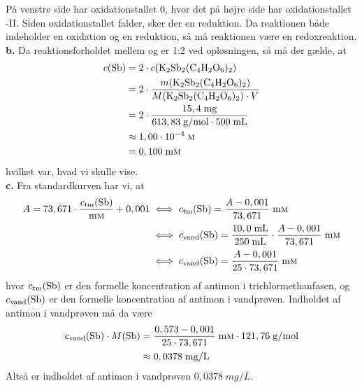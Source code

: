 \documentclass{report}
\begin{document}
På venstre side har  oxidationstallet $0$, hvor det på højre side har oxidationstallet -II. 
Siden oxidationstallet falder, sker der en reduktion.
Da reaktionen både indeholder en oxidation og en reduktion, så må reaktionen være en redoxreaktion.\\[1ex]
\textbf{b.}
Da reaktionsforholdet mellem  og  er 1:2 ved opløsningen, så må der gælde, at
\begin{equation*}
\begin{split}
  c(\ce{Sb} )&=2 \cdot c(\ce{K2Sb2(C4H2O6)2})\\
  &=2 \cdot \frac{m(\ce{K2Sb2(C4H2O6)2})}{M(\ce{K2Sb2(C4H2O6)2}) \cdot V}\\
  &=2 \cdot \frac{15,4\;\unit{mg} }{613,83 \;\unit{g/mol} \cdot 500 \;\unit{mL} }\\
  &\approx 1,00 \cdot 10 ^{-4} \;\unit{\textsc{m}} \\
  &=0,100 \;\unit{m \textsc{m}} 
\end{split}
\end{equation*}
hvilket var, hvad vi skulle vise.\\[1ex]
\textbf{c.}
Fra standardkurven har vi, at
\begin{equation*}
\begin{split}
  A=73,671 \cdot \frac{c_{\text{tm}}(\ce{Sb} )}{\unit{m \textsc{m}}}+0,001 &\iff c_{\text{tm}}(\ce{Sb} )=\frac{A-0,001}{73,671} \;\unit{m \textsc{m}}\\
  &\iff c_{\text{vand}}(\ce{Sb} )=\frac{10,0 \;\unit{mL} }{250 \;\unit{mL} } \cdot \frac{A-0,001}{73,671} \;\unit{m \textsc{m}}\\
  &\iff c_{\text{vand}}(\ce{Sb} )=\frac{A-0,001}{25 \cdot 73,671} \;\unit{m \textsc{m}}
\end{split}
\end{equation*}
hvor $c_{\text{tm} }(\ce{Sb} )$ er den formelle koncentration af antimon i trichlormethanfasen, og $c_{\text{vand}}(\ce{Sb} )$ er den formelle koncentration af antimon i vandprøven.
Indholdet af antimon i vandprøven må da være
\begin{equation*}
\begin{split}
  c_{\text{vand} }(\ce{Sb} ) \cdot M(\ce{Sb})&=\frac{0,573-0,001}{25 \cdot 73,671} \;\unit{m \textsc{m}} \cdot 121,76 \;\unit{g/mol} \\
  &\approx 0,0378 \;\unit{mg/L} 
\end{split}
\end{equation*}
Altså er indholdet af antimon i vandprøven $0,0378 \;\unit{mg/L} $.
\end{document}
